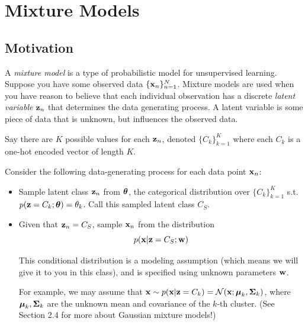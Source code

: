 \documentclass[12pt,letterpaper]{article}
\begin{document}

\section{Mixture Models}

\subsection{Motivation}


A \textit{mixture model} is a type of probabilistic
model for unsupervised learning. Suppose you have some observed data $\{ \mathbf{x}_n \}_{n = 1}^{N}$.  Mixture models are used when you have reason to believe that each individual observation has a discrete \textit{latent variable} $\mathbf{z}_n$ that determines the data generating process. A latent variable is some piece of data that is unknown, but influences the observed data.

Say there are $K$ possible values for each $\mathbf{z}_n$, denoted $\{C_k\}_{k=1}^K$ where each $C_k$ is a one-hot encoded vector of length $K$. 

Consider the following data-generating process for each data point $\mathbf{x}_n$:

\begin{itemize} 
    \item Sample latent class $\mathbf{z}_n$ from $\boldsymbol{\theta}$, the categorical distribution over $\{C_k\}_{k=1}^K$ s.t. \\$p(\mathbf{z} = C_k; \boldsymbol{\theta}) = \theta_k$.  Call this sampled latent class $C_S$.
    \item Given that $\mathbf{z}_n = C_S$, sample $\mathbf{x}_n$ from the distribution
    $$p(\mathbf{x} | \mathbf{z} = C_S; \mathbf{w})$$
    
    This conditional distribution is a modeling assumption (which means we will give it to you in this class), and is specified using unknown parameters $\mathbf{w}$.
    
    For example, we may assume that $\mathbf{x} \sim p(\mathbf{x} | \mathbf{z} = C_k) = \mathcal{N}(\mathbf{x}; \boldsymbol{\mu}_k, \boldsymbol{\Sigma}_k)$, where $\boldsymbol{\mu}_k, \boldsymbol{\Sigma}_k$ are the unknown mean and covariance of the $k$-th cluster.  (See Section 2.4 for more about Gaussian mixture models!)
\end{itemize}
\end{document}
